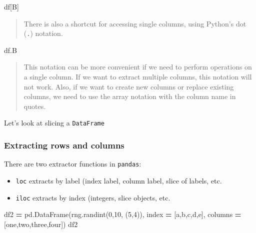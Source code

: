 \documentclass[
  letterpaper,
]{scrbook}
\newenvironment{Shaded}{\begin{snugshade}}{\end{snugshade}}
\newcommand{\DecValTok}[1]{\textcolor[rgb]{0.00,0.00,0.81}{#1}}
\newcommand{\NormalTok}[1]{#1}
\newcommand{\OperatorTok}[1]{\textcolor[rgb]{0.81,0.36,0.00}{\textbf{#1}}}
\newcommand{\StringTok}[1]{\textcolor[rgb]{0.31,0.60,0.02}{#1}}
\providecommand{\tightlist}{%
  \setlength{\itemsep}{0pt}\setlength{\parskip}{0pt}}
\begin{document}
\begin{Shaded}
\begin{Highlighting}[]
\NormalTok{df[}\StringTok{\textquotesingle{}B\textquotesingle{}}\NormalTok{]}
\end{Highlighting}
\end{Shaded}

\begin{quote}
There is also a shortcut for accessing single columns, using Python's dot (\texttt{.}) notation.
\end{quote}

\begin{Shaded}
\begin{Highlighting}[]
\NormalTok{df.B}
\end{Highlighting}
\end{Shaded}

\begin{quote}
This notation can be more convenient if we need to perform operations on a single column. If we want to extract multiple columns, this notation will not work. Also, if we want to create new columns or replace existing columns, we need to use the array notation with the column name in quotes.
\end{quote}

Let's look at slicing a \texttt{DataFrame}

\hypertarget{extracting-rows-and-columns}{%
\subsubsection{Extracting rows and columns}\label{extracting-rows-and-columns}}

There are two extractor functions in \texttt{pandas}:

\begin{itemize}
\tightlist
\item
  \texttt{loc} extracts by label (index label, column label, slice of labels, etc.
\item
  \texttt{iloc} extracts by index (integers, slice objects, etc.
\end{itemize}

\begin{Shaded}
\begin{Highlighting}[]
\NormalTok{df2 }\OperatorTok{=}\NormalTok{ pd.DataFrame(rng.randint(}\DecValTok{0}\NormalTok{,}\DecValTok{10}\NormalTok{, (}\DecValTok{5}\NormalTok{,}\DecValTok{4}\NormalTok{)), }
\NormalTok{                  index }\OperatorTok{=}\NormalTok{ [}\StringTok{\textquotesingle{}a\textquotesingle{}}\NormalTok{,}\StringTok{\textquotesingle{}b\textquotesingle{}}\NormalTok{,}\StringTok{\textquotesingle{}c\textquotesingle{}}\NormalTok{,}\StringTok{\textquotesingle{}d\textquotesingle{}}\NormalTok{,}\StringTok{\textquotesingle{}e\textquotesingle{}}\NormalTok{],}
\NormalTok{                  columns }\OperatorTok{=}\NormalTok{ [}\StringTok{\textquotesingle{}one\textquotesingle{}}\NormalTok{,}\StringTok{\textquotesingle{}two\textquotesingle{}}\NormalTok{,}\StringTok{\textquotesingle{}three\textquotesingle{}}\NormalTok{,}\StringTok{\textquotesingle{}four\textquotesingle{}}\NormalTok{])}
\NormalTok{df2}
\end{Highlighting}
\end{Shaded}
\end{document}
